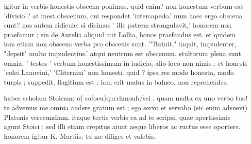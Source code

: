  igitur in verbis honestis obscena ponimus. quid enim? non honestum verbum est 'divisio'? at inest obscenum, cui respondet 'intercapedo.' num haec ergo obscena sunt? nos autem ridicule: si dicimus ' ille patrem strangulavit,' honorem non praefamur ; sin de Aurelia aliquid aut Lollia, honos praefandus est. et quidem iam etiam non obscena verba pro obscenis sunt. '"Batuit," inquit, impudenter, "depsit" multo impudentius.' atqui neutrum est obscenum. stultorum plena sunt omnia. ' testes ' verbum honestissimum in iudicio, alio loco non nimis ; et honesti 'colei Lanuvini,' 'Cliternini' non honesti. quid ? ipsa res modo honesta, modo turpis ; suppedit, flagitium est ; iam erit nudus in balneo, non reprehendes.

 habes scholam Stoicam: o( sofo\s eu)qurrhmonh/sei . quam multa ex uno verbo tuo! te adversus me omnia audere gratum est ; ego servo et servabo (sic enim adsuevi) Platonis verecundiam. itaque tectis verbis ea ad te scripsi, quae apertissimis agunt Stoici ; sed illi etiam crepitus aiunt aeque liberos ac ructus esse oportere. honorem igitur K. Martiis. tu me diliges et valebis.
